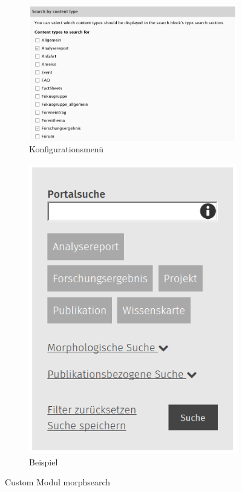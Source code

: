 \begin{figure}[H]
	\centering
	\begin{subfigure}[a]{0.4\textwidth}
		\centering
		\includegraphics[height=0.20\textheight]{images/config_morphsearch}
		\caption[]{Konfigurationsmenü}
		\label{fig:config_morphsearch}
	\end{subfigure}
	\begin{subfigure}[A]{0.4\textwidth}
		\centering
		\includegraphics[height=0.20\textheight]{images/example_morphsearch}
		\caption[]{Beispiel}
		\label{fig:example_morphsearch}
	\end{subfigure}
	\caption{Custom Modul morphsearch}
	\label{fig:morphsearch}
\end{figure}



